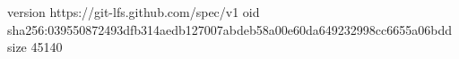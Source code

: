 version https://git-lfs.github.com/spec/v1
oid sha256:039550872493dfb314aedb127007abdeb58a00e60da649232998cc6655a06bdd
size 45140
